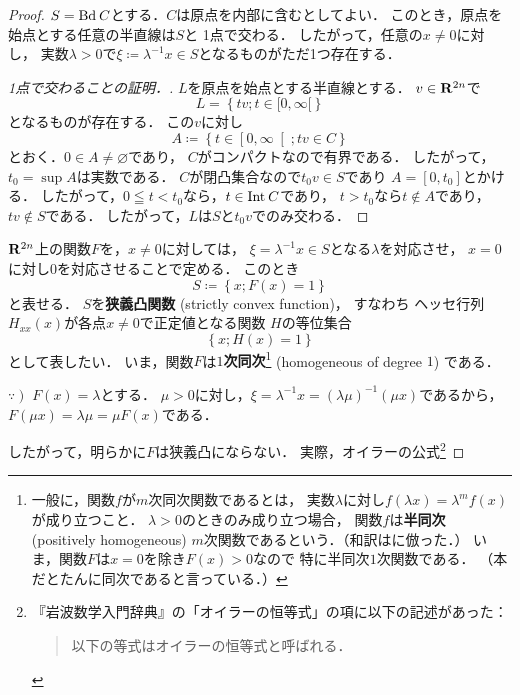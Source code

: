 \begin{proof}
    \(S=\Bd[]C\)とする．\(C\)は原点を内部に含むとしてよい．
    このとき，原点を始点とする任意の半直線は\(S\)と
    1点で交わる．
    したがって，任意の\(x\ne0\)に対し，
    実数\(\lambda>0\)で\(
        \xi\coloneqq \lambda^{-1}x\in S
    \)となるものがただ1つ存在する．
    \begin{redleftbar}\small{
    \begin{proof}[1点で交わることの証明．]
        \(L\)を原点を始点とする半直線とする．
        \(v\in\rr^{2n}\)で\[
            L=\left\{tv;t\in[0,\infty[\right\}
        \]となるものが存在する．
        この\(v\)に対し\[
            A\coloneqq
            \left\{
                t\in{\left[0,\infty\right[} 
                \mathrel{;}
                tv\in C
            \right\}
        \]とおく．\(0\in A\ne\varnothing\)であり，
        \(C\)がコンパクトなので有界である．
        したがって，\(t_0=\sup A\)は実数である．
        \(C\)が閉凸集合なので\(t_0v\in S\)であり
        \(A=[0,t_0]\)とかける．
        したがって，\(0\leqq t<t_0\)なら，\(t\in\Int[]C\)であり，
        \(t>t_0\)なら\(t\notin A\)であり，\(tv\notin S\)である．
        したがって，\(L\)は\(S\)と\(t_0v\)でのみ交わる．
    \end{proof}}
    \end{redleftbar}
    \(\rr^{2n}\)上の関数\(F\)を，\(x\ne0\)に対しては，
    \(\xi=\lambda^{-1}x\in S\)となる\(\lambda\)を対応させ，
    \(x=0\)に対し\(0\)を対応させることで定める．
    このとき\[
        S\coloneqq\left\{x; F(x)=1\right\}
    \]と表せる．
    \(S\)を\textbf{狭義凸関数} (strictly convex function)，
    すなわち%
        ヘッセ行列\(H_{xx}(x)\)が各点\(x\ne0\)で正定値となる関数
    \(H\)の等位集合\[
        \left\{x;H(x)=1\right\}
    \]として表したい．
    いま，関数\(F\)は\textbf{\(1\)次同次}\footnote{
        一般に，関数\(f\)が\(m\)次同次関数であるとは，
        実数\(\lambda\)に対し\(
            f(\lambda x)=\lambda^m f(x)
        \)が成り立つこと．
        \(\lambda>0\)のときのみ成り立つ場合，
        関数\(f\)は\textbf{半同次} (positively 
        homogeneous) \(m\)次関数であるという．（和訳は\cite[注5.1]{福80}に倣った．）
        いま，関数\(F\)は\(x=0\)を除き\(F(x)>0\)なので
        特に半同次\(1\)次関数である．
        （本だとたんに同次であると言っている．）
    } (homogeneous 
    of degree \(1\)) である．
    \begin{redleftbar}
        \(\left.\because\right)\) \(F(x)=\lambda\)とする．
        \(\mu>0\)に対し，\(
            \xi=\lambda^{-1}x=(\lambda\mu)^{-1}(\mu x)
        \)であるから，\(F(\mu x)=\lambda\mu=\mu F(x)\)である．    
    \end{redleftbar}    
    \noindent
    したがって，明らかに\(F\)は狭義凸にならない．
    実際，オイラーの公式\footnote{
        『岩波数学入門辞典』の「オイラーの恒等式」の項に以下の記述があった：
        \begin{quotation}
            以下の等式はオイラーの恒等式と呼ばれる．


\end{quotation}}
\end{proof}
